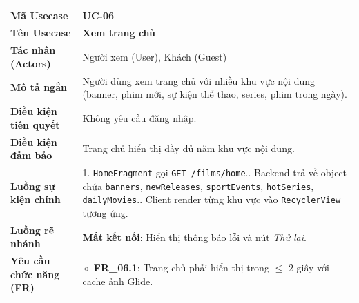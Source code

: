 \begin{table}[H]
\renewcommand{\arraystretch}{1.3}
\centering
\begin{tabularx}{\textwidth}{|p{4.5cm}|X|}
\hline
\cellcolor{gray!15}\bfseries Mã Usecase & \textbf{UC-06} \\ \hline
\cellcolor{gray!15}\bfseries Tên Usecase & \textbf{Xem trang chủ} \\ \hline
\cellcolor{gray!15}\bfseries Tác nhân (Actors) & Người xem (User), Khách (Guest) \\ \hline
\cellcolor{gray!15}\bfseries Mô tả ngắn & Người dùng xem trang chủ với nhiều khu vực nội dung (banner, phim mới, sự kiện thể thao, series, phim trong ngày). \\ \hline
\cellcolor{gray!15}\bfseries Điều kiện tiên quyết & Không yêu cầu đăng nhập. \\ \hline
\cellcolor{gray!15}\bfseries Điều kiện đảm bảo & Trang chủ hiển thị đầy đủ năm khu vực nội dung. \\ \hline
\cellcolor{gray!15}\bfseries Luồng sự kiện chính & 1. \texttt{HomeFragment} gọi \texttt{GET /films/home}.\newline 2. Backend trả về object chứa \texttt{banners}, \texttt{newReleases}, \texttt{sportEvents}, \texttt{hotSeries}, \texttt{dailyMovies}.\newline 3. Client render từng khu vực vào \texttt{RecyclerView} tương ứng. \\ \hline
\cellcolor{gray!15}\bfseries Luồng rẽ nhánh & \textbf{Mất kết nối}: Hiển thị thông báo lỗi và nút \textit{Thử lại}. \\ \hline
\cellcolor{gray!15}\bfseries Yêu cầu chức năng (FR) & $\diamond$ \textbf{FR\_06.1}: Trang chủ phải hiển thị trong $\leq$ 2 giây với cache ảnh Glide. \\ \hline
\end{tabularx}
\end{table}


